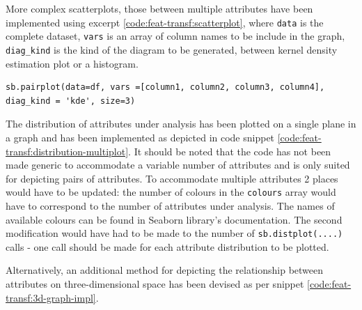 More complex scatterplots, those between multiple attributes have been implemented using excerpt \ref{code:feat-transf:scatterplot}, where \texttt{data} is the complete dataset, \texttt{vars} is an array of column names to be include in the graph, \texttt{diag\_kind} is the kind of the diagram to be generated, between kernel density estimation plot or a histogram.
\begin{code}
\label{code:feat-transf:scatterplot}
\begin{verbatim}
sb.pairplot(data=df, vars =[column1, column2, column3, column4], diag_kind = 'kde', size=3)
\end{verbatim}
\end{code}

The distribution of attributes under analysis has been plotted on a single plane in a graph and has been implemented as depicted in code snippet \ref{code:feat-transf:distribution-multiplot}. It should be noted that the code has not been made generic to accommodate a variable number of attributes and is only suited for depicting pairs of attributes. To accommodate multiple attributes 2 places would have to be updated: the number of colours in the \texttt{colours} array would have to correspond to the number of attributes under analysis. The names of available colours can be found in Seaborn library's documentation. The second modification would have had to be made to the number of \texttt{sb.distplot(....)} calls - one call should be made for each attribute distribution to be plotted.

Alternatively, an additional method for depicting the relationship between attributes on three-dimensional space has been devised as per snippet \ref{code:feat-transf:3d-graph-impl}.

\FloatBarrier

